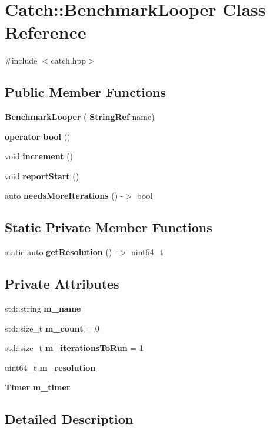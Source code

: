 \section{Catch\+::Benchmark\+Looper Class Reference}
\label{class_catch_1_1_benchmark_looper}


{\ttfamily \#include $<$catch.\+hpp$>$}

\subsection*{Public Member Functions}
\begin{DoxyCompactItemize}
\item 
\textbf{ Benchmark\+Looper} (\textbf{ String\+Ref} name)
\item 
\textbf{ operator bool} ()
\item 
void \textbf{ increment} ()
\item 
void \textbf{ report\+Start} ()
\item 
auto \textbf{ needs\+More\+Iterations} () -\/$>$ bool
\end{DoxyCompactItemize}
\subsection*{Static Private Member Functions}
\begin{DoxyCompactItemize}
\item 
static auto \textbf{ get\+Resolution} () -\/$>$ uint64\+\_\+t
\end{DoxyCompactItemize}
\subsection*{Private Attributes}
\begin{DoxyCompactItemize}
\item 
std\+::string \textbf{ m\+\_\+name}
\item 
std\+::size\+\_\+t \textbf{ m\+\_\+count} = 0
\item 
std\+::size\+\_\+t \textbf{ m\+\_\+iterations\+To\+Run} = 1
\item 
uint64\+\_\+t \textbf{ m\+\_\+resolution}
\item 
\textbf{ Timer} \textbf{ m\+\_\+timer}
\end{DoxyCompactItemize}


\subsection{Detailed Description}



